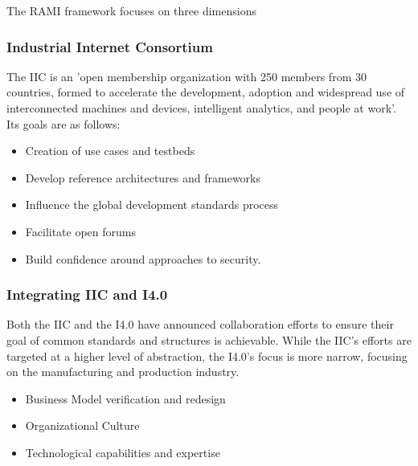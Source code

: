 The \ac{RAMI} framework focuses on three dimensions
%

\subsubsection{Industrial Internet Consortium}
The IIC is an 'open membership organization with 250 members from 30 countries, formed to accelerate the development, adoption and widespread use of interconnected machines and devices, intelligent analytics, and people at work'\cite{iic-progress:2016}. Its goals are as follows:

\begin{itemize}
	\item  Creation of use cases and testbeds
\item  Develop reference architectures and frameworks
\item  Influence the global development standards process
\item  Facilitate open forums
\item  Build confidence around approaches to security.
\end{itemize}
\cite{iic-aboutus:2016}


\subsubsection{Integrating IIC and I4.0}

Both the IIC and the I4.0 have announced collaboration efforts to ensure their goal of common standards and structures is achievable. While the IIC's efforts are targeted at a higher level of abstraction, the I4.0's focus is more narrow, focusing on the manufacturing and production industry. 


\begin{itemize}
	\item Business Model verification and redesign \cite{gassmann2013geschaeftsmodelle}
	\item Organizational Culture
	\item Technological capabilities and expertise
\end{itemize}






